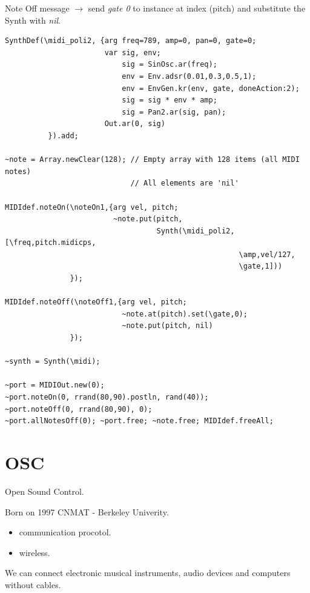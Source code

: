 Note Off message \(\rightarrow\) send \textit{gate 0} to instance at index (pitch) and substitute the Synth with \textit{nil}.

\begin{lstlisting}[frame=single, caption=MIDI poliphonic w-sustain instrument model] 
SynthDef(\midi_poli2, {arg freq=789, amp=0, pan=0, gate=0;
                       var sig, env;
                           sig = SinOsc.ar(freq);
                           env = Env.adsr(0.01,0.3,0.5,1);
                           env = EnvGen.kr(env, gate, doneAction:2);
                           sig = sig * env * amp;
                           sig = Pan2.ar(sig, pan);
                       Out.ar(0, sig)
          }).add;

~note = Array.newClear(128); // Empty array with 128 items (all MIDI notes) 
                             // All elements are 'nil'

MIDIdef.noteOn(\noteOn1,{arg vel, pitch;
	                     ~note.put(pitch, 
                                   Synth(\midi_poli2,[\freq,pitch.midicps,
                                                      \amp,vel/127,
                                                      \gate,1]))
               });

MIDIdef.noteOff(\noteOff1,{arg vel, pitch;
	                       ~note.at(pitch).set(\gate,0);
	                       ~note.put(pitch, nil)
               });

~synth = Synth(\midi);

~port = MIDIOut.new(0);
~port.noteOn(0, rrand(80,90).postln, rand(40));
~port.noteOff(0, rrand(80,90), 0);   
~port.allNotesOff(0); ~port.free; ~note.free; MIDIdef.freeAll;
\end{lstlisting} 

\section{OSC}\label{osc}

Open Sound Control.

Born on 1997 CNMAT - Berkeley Univerity.

\begin{itemize}
\tightlist
\item communication procotol.
\item wireless.
\end{itemize}

We can connect electronic musical instruments, audio devices and computers without cables.

